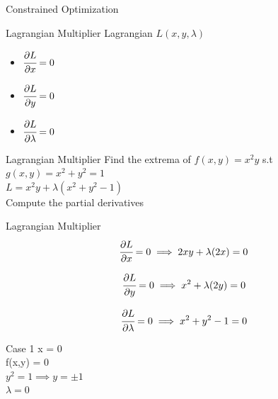 \documentclass{beamer}
\begin{document}
\begin{frame}{Constrained Optimization}

\end{frame}

\begin{frame}{Lagrangian Multiplier}
Lagrangian $L(x,y,\lambda)$
\begin{itemize}
\item $\cfrac{\partial L}{\partial x} = 0$
\item $\cfrac{\partial L}{\partial y} = 0$
\item $\cfrac{\partial L}{\partial \lambda} = 0$
\end{itemize}

\end{frame}


\begin{frame}{Lagrangian Multiplier}
Find the extrema of $f(x,y) =x^{2}y$ s.t $g(x,y)=x^{2}+y^{2} = 1$ \\
\vspace{1em}
$L = x^{2}y + \lambda (x^{2} + y^{2} - 1)$\\
\vspace{1em}
Compute the partial derivatives
\end{frame}

\begin{frame}{Lagrangian Multiplier}
\begin{equation}
\cfrac{\partial L}{\partial x} = 0 \implies 2xy + \lambda(2x) = 0
\end{equation}

\begin{equation}
\cfrac{\partial L}{\partial y} = 0 \implies x^{2} + \lambda(2y) = 0
\end{equation}

\begin{equation}
\cfrac{\partial L}{\partial \lambda} = 0 \implies x^{2} + y^{2} - 1 = 0
\end{equation}
\end{frame}

\begin{frame}{Case 1}
x = 0\\
\vspace{1em}
f(x,y) = 0\\
\vspace{1em}
$y^{2} = 1 \implies y= \pm 1$\\
\vspace{1em}
$\lambda = 0$
\end{frame}
\end{document}
